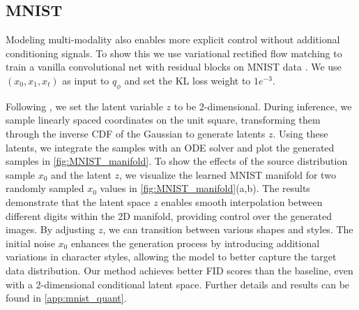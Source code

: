 \subsection{MNIST}
\label{sec:mnist}




Modeling multi-modality  also enables more explicit control %
without additional conditioning signals. To show this we use variational rectified flow matching to train a vanilla convolutional net with residual blocks \citep{he2015deepresiduallearningimage} on  MNIST data \citep{lecun1998gradient}. We use $(x_0, x_1, x_t)$ as input to $q_\phi$ and set the  KL loss weight to $1e^{-3}$. %

Following \citet{KingmaICLR2014}, we set the latent variable \(z\) to be 2-dimensional. During inference, we sample linearly spaced coordinates on the unit square, transforming them through the inverse CDF of the Gaussian to generate latents \(z\). Using these latents, we integrate the samples with an ODE solver and plot the generated samples %
in \cref{fig:MNIST_manifold}. To show the effects of the source distribution sample \(x_0\) and the latent \(z\), we visualize the learned MNIST manifold for two randomly sampled \(x_0\) values in \cref{fig:MNIST_manifold}(a,b). The results demonstrate that the latent space \(z\) enables smooth interpolation between different digits within the 2D manifold, providing  control over the generated images. By adjusting \(z\), we can  transition between various shapes and styles. %
The initial noise \(x_0\) enhances the generation process by introducing additional variations in character styles, allowing the model to better capture the target data distribution. 
Our method achieves better FID scores than the baseline, even with a 2-dimensional conditional latent space. Further details and results can be found in \cref{app:mnist_quant}.






